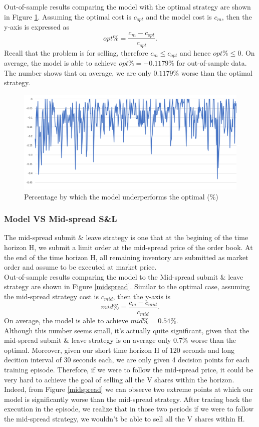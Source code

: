 \documentclass[12pt]{extarticle}
\begin{document}
\noindent Out-of-sample results comparing the model with the optimal strategy are shown in Figure \ref{optimal}.
Assuming the optimal cost is $c_{opt}$ and the model cost is $c_{m}$, then the y-axis
is expressed as $$opt\% = \frac{c_{m} - c_{opt}}{c_{opt}}.$$
Recall that the problem is for selling, therefore $c_{m} \le c_{opt}$ and hence $opt\% \le 0$.
On average, the model is able to achieve $\bar{opt\%} = -0.1179\%$ for out-of-sample data.
The number shows that on average, we are only $0.1179\%$ worse than the optimal strategy.

\begin{figure}[h]
\centering
\includegraphics[width=\textwidth]{optimal}
\caption{Percentage by which the model underperforms the optimal (\%)}
\label{optimal}
\end{figure}

\subsubsection{Model VS Mid-spread S\&L}

The mid-spread submit \& leave strategy is one that at the begining of the time
horizon H, we submit a limit order at the mid-spread price of the order book.
At the end of the time horizon H, all remaining inventory are submitted as market
order and assume to be executed at market price.\\


\noindent Out-of-sample results comparing the model to the Mid-spread submit \& leave strategy are shown
in Figure \ref{midspread}. Similar to the optimal case, assuming the mid-spread strategy
cost is $c_{mid}$, then the y-axis is $$mid\% = \frac{c_{m} - c_{mid}}{c_{mid}}.$$
On average, the model is able to achieve $mid\% = 0.54\%$.\\


\noindent Although this number seems small, it's actually quite significant, given that the
mid-spread submit \& leave strategy is on average only $0.7\%$ worse than the optimal.
Moreover, given our short time horizon H of 120 seconds and long decition interval
of 30 seconds each, we are only given 4 decision points for each training episode.
Therefore, if we were to follow the mid-spread price, it could be very hard to achieve the
goal of selling all the V shares within the horizon. Indeed, from Figure \ref{midspread}
we can observe two extreme points at which our model is significantly worse than
the mid-spread strategy. After tracing back the execution in the episode,
we realize that in those two periods if we were to follow the mid-spread strategy,
we wouldn't be able to sell all the V shares within H.
\end{document}
